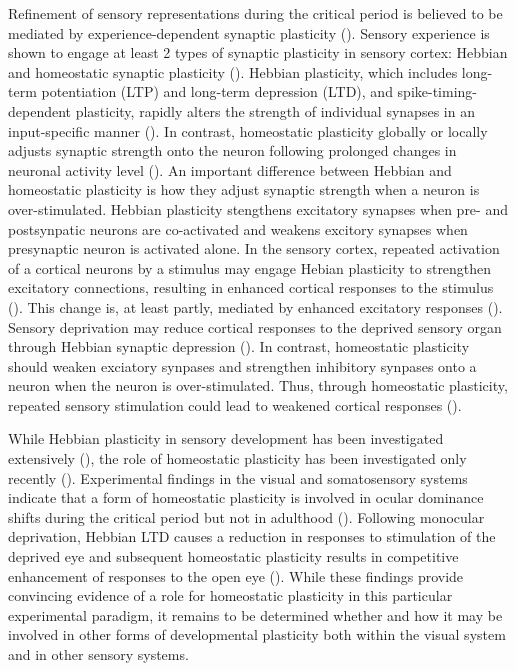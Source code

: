 Refinement of sensory representations during the critical period is believed to be mediated by experience-dependent synaptic plasticity (\cite{Dan2006, Feldman2009}). Sensory experience is shown to engage at least 2 types of synaptic plasticity in sensory cortex: Hebbian and homeostatic synaptic plasticity (\cite{Desai2002, Fu2002, Heynen2003, Crozier2007, Goel2007, Maffei2008}). Hebbian plasticity, which includes long-term potentiation (LTP) and long-term depression (LTD), and spike-timing­-dependent plasticity, rapidly alters the strength of individual synapses in an input-specific manner (\cite{Zhang1998, Abbott2000, Malenka2004, Dan2006}). In contrast, homeostatic plasticity globally or locally adjusts synaptic strength onto the neuron following prolonged changes in neuronal activity level (\cite{Davis2001, Burrone2003, Turrigiano2004, Hou2008}). An important difference between Hebbian and homeostatic plasticity is how they adjust synaptic strength when a neuron is over-stimulated. Hebbian plasticity stengthens excitatory synapses when pre- and postsynpatic neurons are co-activated and weakens excitory synapses when presynaptic neuron is activated alone. In the sensory cortex, repeated activation of a cortical neurons by a stimulus may engage Hebian plasticity to strengthen excitatory connections, resulting in enhanced cortical responses to the stimulus (\cite{Zhang2001}). This change is, at least partly, mediated by enhanced excitatory responses (\cite{Froemke2007, Sun2010}). Sensory deprivation may reduce cortical responses to the deprived sensory organ through Hebbian synaptic depression (\cite{Heynen2003}). In contrast, homeostatic plasticity should weaken exciatory synpases and strengthen inhibitory synpases onto a neuron when the neuron is over-stimulated. Thus, through homeostatic plasticity, repeated sensory stimulation could lead to weakened cortical responses (\cite{Condon1991, Pienkowski2012}).

While Hebbian plasticity in sensory development has been investigated extensively (\cite{Feldman2009}), the role of homeostatic plasticity has been investigated only recently (\cite{Mrsic-Flogel2007}). Experimental findings in the visual and somatosensory systems indicate that a form of homeostatic plasticity is involved in ocular dominance shifts during the critical period but not in adulthood (\cite{Kaneko2008, Ranson2012}). Following monocular deprivation, Hebbian LTD causes a reduction in responses to stimulation of the deprived eye and subsequent homeostatic plasticity results in competitive enhancement of responses to the open eye (\cite{Frenkel2004, Kaneko2008, Ranson2012}). While these findings provide convincing evidence of a role for homeostatic plasticity in this particular experimental paradigm, it remains to be determined whether and how it may be involved in other forms of developmental plasticity both within the visual system and in other sensory systems.

